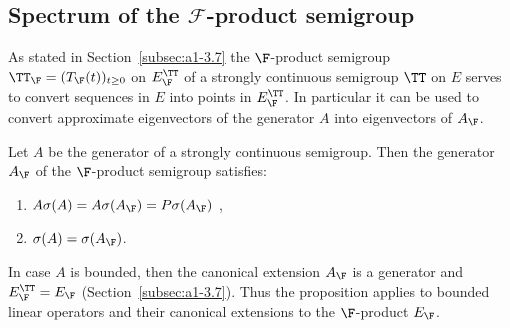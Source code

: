 \subsection{Spectrum of the 
\texorpdfstring{$\mathcal{F}$-product}{F-product} semigroup}\label{subsec:a3-4.5}
As stated in Section~\ref{subsec:a1-3.7} the $\F$-product semigroup $\TT_{\F} = (T_{\F}(t))_{t \geq 0}$ on $E_{\F}^{\TT}$ of a strongly continuous semigroup $\TT$ on $E$ serves to convert sequences in $E$ into points in $E_{\F}^{\TT}$.
In particular it can be used to convert approximate eigenvectors of the generator $A$ into eigenvectors of\/ $A_{\F}$.
\begin{proposition}\label{prop:a3-4.4}
Let $A$ be the generator of a strongly continuous semigroup. Then the generator $A_{\F}$ of the $\F$-product semigroup satisfies:
\begin{enumerate}[\upshape (i)]
\item 
	$A\sigma(A) = A\sigma(A_{\F}) = P\sigma(A_{\F})$ ,

\item 
	$\sigma(A) = \sigma(A_{\F})$. 
\end{enumerate}
\end{proposition}
\begin{remark}
In case $A$ is bounded, then the canonical extension $A_{\F}$ is a generator and $E_{\F}^{\TT} = E_{\F}$ (\cf Section~\ref{subsec:a1-3.7}).
Thus the proposition applies to bounded linear operators and their canonical extensions to the 
$\F$-product $E_{\F}$.
\end{remark}
